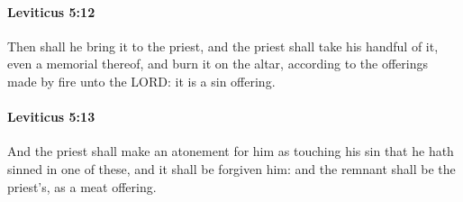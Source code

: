 		\paragraph{Leviticus 5:12} %
			\label{LEVITICUS-5-12}

			Then shall he bring it to the priest, and the priest shall take his handful of it, even a memorial thereof, and burn it on the altar, according to the offerings made by fire unto the LORD: it is a sin offering.


		\paragraph{Leviticus 5:13} %
			\label{LEVITICUS-5-13}

			And the priest shall make an atonement for him as touching his sin that he hath sinned in one of these, and it shall be forgiven him: and the remnant shall be the priest’s, as a meat offering.

